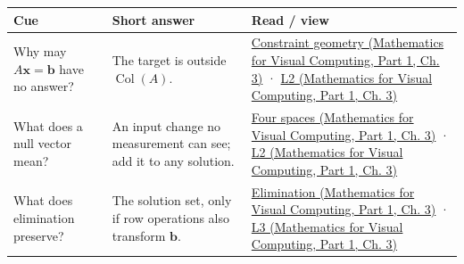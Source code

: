 {\def\LTcaptype{none} %
\begin{longtable}[]{@{}
  >{\raggedright\arraybackslash}p{}
  >{\raggedright\arraybackslash}p{}
  >{\raggedright\arraybackslash}p{}@{}}
\toprule\noalign{}
\begin{minipage}[b]{\linewidth}\raggedright
Cue
\end{minipage} & \begin{minipage}[b]{\linewidth}\raggedright
Short answer
\end{minipage} & \begin{minipage}[b]{\linewidth}\raggedright
Read / view
\end{minipage} \\
\midrule\noalign{}
\endhead
\bottomrule\noalign{}
\endlastfoot
Why may \(A\mathbf x=\mathbf b\) have no answer? & The target is outside \(\operatorname{Col}(A)\). & \href{../02-Mathematics-for-Visual-Computing-P01/main.pdf\#nameddest=01-foundations-i-ch019-a-linear-equation-is-a-measurement-and-several-equations-are-geometry}{Constraint geometry (Mathematics for Visual Computing, Part 1, Ch. 3)} · \href{../02-Mathematics-for-Visual-Computing-P01/main.pdf\#nameddest=01-foundations-i-ch019-figure-l2---consistency-freedom-and-the-four-fundamental-spaces}{L2 (Mathematics for Visual Computing, Part 1, Ch. 3)} \\
What does a null vector mean? & An input change no measurement can see; add it to any solution. & \href{../02-Mathematics-for-Visual-Computing-P01/main.pdf\#nameddest=01-foundations-i-ch019-rank-separates-what-the-measurements-determine-from-what-they-leave-free}{Four spaces (Mathematics for Visual Computing, Part 1, Ch. 3)} · \href{../02-Mathematics-for-Visual-Computing-P01/main.pdf\#nameddest=01-foundations-i-ch019-figure-l2---consistency-freedom-and-the-four-fundamental-spaces}{L2 (Mathematics for Visual Computing, Part 1, Ch. 3)} \\
What does elimination preserve? & The solution set, only if row operations also transform \(\mathbf b\). & \href{../02-Mathematics-for-Visual-Computing-P01/main.pdf\#nameddest=01-foundations-i-ch019-elimination-turns-the-geometry-into-an-auditable-calculation}{Elimination (Mathematics for Visual Computing, Part 1, Ch. 3)} · \href{../02-Mathematics-for-Visual-Computing-P01/main.pdf\#nameddest=01-foundations-i-ch019-figure-l3---elimination-stores-work-for-later-solves}{L3 (Mathematics for Visual Computing, Part 1, Ch. 3)} \\

\end{longtable}}
